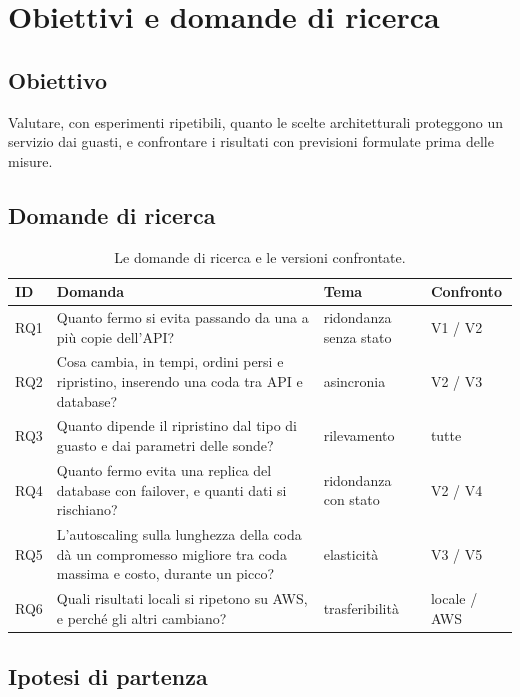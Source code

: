 \chapter{Obiettivi e domande di ricerca}
\label{cap:obiettivi}

\section{Obiettivo}

Valutare, con esperimenti ripetibili, quanto le scelte architetturali proteggono un servizio dai guasti, e confrontare i risultati con previsioni formulate prima delle misure.

\section{Domande di ricerca}

\begin{table}[htbp]
\centering
\caption{Le domande di ricerca e le versioni confrontate.}
\label{tab:rq}
\begin{tabularx}{\linewidth}{@{}lLll@{}}
\toprule
\textbf{ID} & \textbf{Domanda} & \textbf{Tema} & \textbf{Confronto} \\
\midrule
RQ1 & Quanto fermo si evita passando da una a più copie dell'API? & ridondanza senza stato & V1 / V2 \\
RQ2 & Cosa cambia, in tempi, ordini persi e ripristino, inserendo una coda tra API e database? & asincronia & V2 / V3 \\
RQ3 & Quanto dipende il ripristino dal tipo di guasto e dai parametri delle sonde? & rilevamento & tutte \\
RQ4 & Quanto fermo evita una replica del database con failover, e quanti dati si rischiano? & ridondanza con stato & V2 / V4 \\
RQ5 & L'autoscaling sulla lunghezza della coda dà un compromesso migliore tra coda massima e costo, durante un picco? & elasticità & V3 / V5 \\
RQ6 & Quali risultati locali si ripetono su AWS, e perché gli altri cambiano? & trasferibilità & locale / AWS \\
\bottomrule
\end{tabularx}
\end{table}

\section{Ipotesi di partenza}

